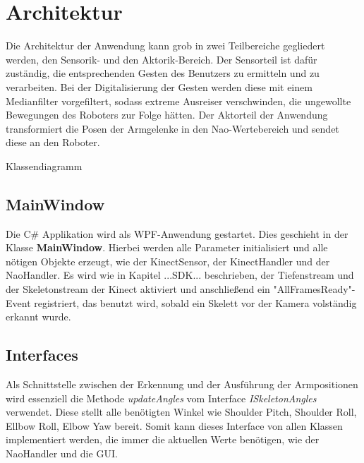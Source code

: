 %
%
\section{Architektur}\label{k:Architektur}
Die Architektur der Anwendung kann grob in zwei Teilbereiche gegliedert werden, den Sensorik- und den Aktorik-Bereich.
Der Sensorteil ist dafür zuständig, die entsprechenden Gesten des Benutzers zu ermitteln und zu verarbeiten. Bei der Digitalisierung der Gesten werden diese mit einem Medianfilter vorgefiltert, sodass extreme Ausreiser verschwinden, die ungewollte Bewegungen des Roboters zur Folge hätten.
Der Aktorteil der Anwendung transformiert die Posen der Armgelenke in den Nao-Wertebereich und sendet diese an den Roboter.

%
%
%

Klassendiagramm

\subsection{MainWindow}
Die C\# Applikation wird als WPF-Anwendung gestartet. Dies geschieht in der Klasse \textbf{MainWindow}. Hierbei werden alle Parameter initialisiert und alle nötigen Objekte erzeugt, wie der KinectSensor, der KinectHandler und der NaoHandler. Es wird wie in Kapitel ...SDK... beschrieben, der Tiefenstream und der Skeletonstream der Kinect aktiviert und anschließend ein "AllFramesReady"-Event registriert, das benutzt wird, sobald ein Skelett vor der Kamera volständig erkannt wurde. 


\subsection{Interfaces}
Als Schnittstelle zwischen der Erkennung und der Ausführung der Armpositionen wird essenziell die Methode \textit{updateAngles} vom Interface \textit{ISkeletonAngles} verwendet. Diese stellt alle benötigten Winkel wie Shoulder Pitch, Shoulder Roll, Ellbow Roll, Elbow Yaw bereit. Somit kann dieses Interface von allen Klassen implementiert werden, die immer die aktuellen Werte benötigen, wie der NaoHandler und die GUI.


